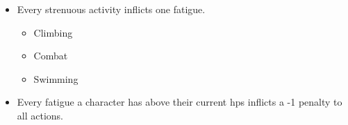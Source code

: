 \begin{itemize}
  \item
  Every strenuous activity inflicts one \gls{fatigue}.
  \begin{itemize}
    \item
    Climbing
    \item
    Combat
    \item
    Swimming
  \end{itemize}
  \item
  Every \gls{fatigue} a character has above their current \glspl{hp} inflicts a -1 penalty to all actions.
\end{itemize}
